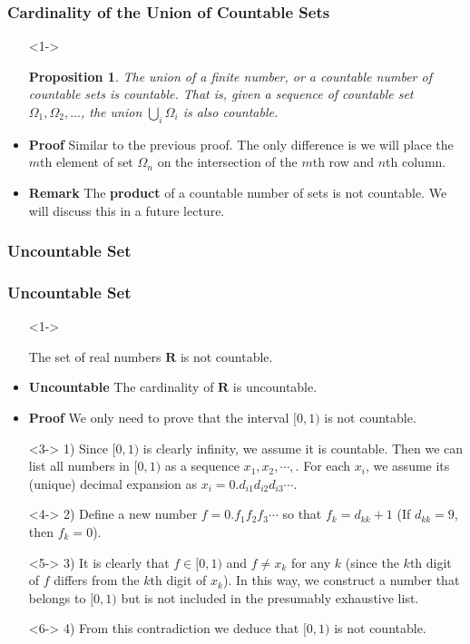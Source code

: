 \documentclass[handout]{beamer}
\newtheorem{Proposition}[theorem]{Proposition}
\begin{document}
\frame
{
  \frametitle{Cardinality of the Union of Countable Sets}

  \begin{itemize}
  \item [] <1-> \begin{Proposition} The union of a finite number, or a countable number of countable sets is countable. That is, given a sequence of countable set $\Omega_1, \Omega_2,\ldots $, the union $\bigcup_i \Omega_i $ is also countable. \end{Proposition}

  \item<2-> \textbf{Proof} Similar to the previous proof. The only difference is we will place the $m$th element of set $\Omega_n$ on  the intersection of the $m$th row and $n$th column. 
    
     \item<3-> \textbf{Remark} The \textbf{product} of a countable number of sets is not countable. We will discuss this in a future lecture. 
   
  \end{itemize}
}

\subsubsection{Uncountable Set}

\frame
{
  \frametitle{Uncountable Set}

  \begin{itemize}
  \item [] <1-> \begin{Theorem} The set of real numbers $\mathbf{R}$ is not countable. \end{Theorem} 
  \item <1-> \textbf{Uncountable} The cardinality of $\mathbf{R}$ is uncountable. 

  \item<2-> \textbf{Proof}  We only need to prove that the interval $[0,1)$ is not countable. 
  \item[]<3-> 1) Since $[0,1)$ is clearly infinity, we assume it is countable. Then we can list all numbers in $[0,1)$ as a sequence $x_1,x_2,\cdots,$. For each $x_i$, we assume its (unique) decimal expansion as $x_i=0.d_{i1}d_{i2}d_{i3}\cdots $. 

  \item[]<4-> 2) Define a new number $f=0.f_1f_2f_3\cdots$ so that $f_k=d_{kk}+1$ (If $d_{kk}=9$, then $f_k=0$). 

  \item[]<5-> 3) It is clearly that $f\in [0,1)$ and $f\neq x_k$ for any $k$ (since the $k$th digit of $f$ differs from the $k$th digit of $x_k$). In this way, we construct a number that belongs to $[0,1)$ but is not included in the presumably exhaustive list. 

  \item[]<6-> 4) From this contradiction we deduce that $[0,1)$ is not countable. 


    
  \end{itemize}
}
\end{document}
